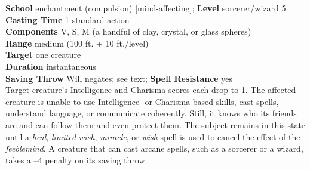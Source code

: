 \textbf{School} enchantment (compulsion) [mind-affecting]; \textbf{Level} sorcerer/wizard 5\\
\textbf{Casting Time} 1 standard action\\
\textbf{Components} V, S, M (a handful of clay, crystal, or glass spheres)\\
\textbf{Range }medium (100 ft. + 10 ft./level)\\
\textbf{Target} one creature\\
\textbf{Duration} instantaneous\\
\textbf{Saving Throw }Will negates; see text; \textbf{Spell Resistance} yes\\
Target creature's Intelligence and Charisma scores each drop to 1. The affected creature is unable to use Intelligence- or Charisma-based skills, cast spells, understand language, or communicate coherently. Still, it knows who its friends are and can follow them and even protect them. The subject remains in this state until a \textit{heal}, \textit{limited wish}, \textit{miracle}, or \textit{wish }spell is used to cancel the effect of the \textit{feeblemind}. A creature that can cast arcane spells, such as a sorcerer or a wizard, takes a --4 penalty on its saving throw.\\
